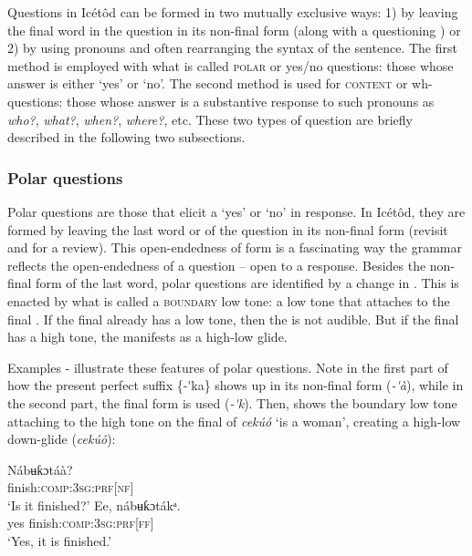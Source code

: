 Questions in Icétôd can be formed in two mutually exclusive ways: 1) by leaving the final word in the question in its non-final form (along with a questioning ) or 2) by using  pronouns and often rearranging the syntax of the sentence. The first method is employed with what is called \textsc{polar} or yes/no questions: those whose answer is either ‘yes’ or ‘no’. The second method is used for \textsc{content} or wh-questions: those whose answer is a substantive response to such  pronouns as \textit{who?}, \textit{what?}, \textit{when?}, \textit{where?}, etc. These two types of question are briefly described in the following two subsections.


\subsubsection{Polar questions}\label{sec:10.4.2}

Polar questions are those that elicit a ‘yes’ or ‘no’ in response. In Icétôd, they are formed by leaving the last word or  of the question in its non-final form (revisit  and  for a review). This open-endedness of form is a fascinating way the grammar reflects the open-endedness of a question – open to a response. Besides the non-final form of the last word, polar questions are identified by a change in . This   is enacted by what is called a \textsc{boundary} low tone: a low tone that attaches to the final . If the final  already has a low tone, then the  is not audible. But if the final  has a high tone, the  manifests as a high-low glide. 

Examples - illustrate these features of polar questions. Note in the first part of  how the present perfect suffix \{-\'{}ka\} shows up in its non-final form (\textit{{}-\'{}à}), while in the second part, the final form is used (\textit{{}-\'{}k\ᵃ}). Then,  shows the  boundary low tone attaching to the high tone on the final  of \textit{cekúó} ‘is a woman’, creating a high-low down-glide (\textit{cekúô}):




\ea\label{ex:syn:44}
  \ea
  \gll Nábʉƙɔtáà?\\
finish:\textsc{comp:3sg:prf}[\textsc{nf}]  \\
  \glt ‘Is it finished?’    
  \ex
  \gll Ee, nábʉƙɔtákᵃ. \\
     yes finish:\textsc{comp:3sg:prf[ff]}   \\
  \glt ‘Yes, it is finished.’
  \z
\z





